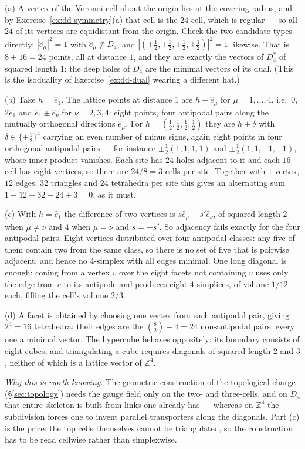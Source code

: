 {(a) A vertex of the Voronoi cell about the origin lies at the covering radius,
and by Exercise~\ref{ex:dd-symmetry}(a) that cell is the $24$-cell, which is
regular --- so all $24$ of its vertices are equidistant from the origin. Check
the two candidate types directly: $|\hat e_\mu|^2=1$ with $\hat e_\mu \notin
D_4$, and $|(\pm\tfrac12,\pm\tfrac12,\pm\tfrac12,\pm\tfrac12)|^2=1$ likewise.
That is $8+16=24$ points, all at distance $1$, and they are exactly the vectors
of $D_4^{*}$ of squared length $1$: the deep holes of $D_4$ are the minimal
vectors of its dual. (This is the isoduality of Exercise~\ref{ex:dd-dual}
wearing a different hat.)

(b) Take $h=\hat e_1$. The lattice points at distance $1$ are $h \pm \hat
e_\mu$ for $\mu=1,\dots,4$, i.e.\ $0$, $2\hat e_1$ and
$\hat e_1 \pm \hat e_\nu$ for $\nu=2,3,4$: eight points, four antipodal pairs
along the mutually orthogonal directions $\hat e_\mu$. For
$h=(\tfrac12,\tfrac12,\tfrac12,\tfrac12)$ they are $h+\delta$ with
$\delta\in\{\pm\tfrac12\}^4$ carrying an even number of minus signs, again
eight points in four orthogonal antipodal pairs --- for instance
$\pm\tfrac12(1,1,1,1)$ and $\pm\tfrac12(1,1,-1,-1)$, whose inner product
vanishes. Each site has $24$ holes adjacent to it and each $16$-cell has eight
vertices, so there are $24/8=3$ cells per site. Together with $1$ vertex, $12$
edges, $32$ triangles and $24$ tetrahedra per site this gives an alternating
sum $1-12+32-24+3=0$, as it must.

(c) With $h=\hat e_1$ the difference of two vertices is
$s\hat e_\mu - s'\hat e_\nu$, of squared length $2$ when $\mu\neq\nu$ and $4$
when $\mu=\nu$ and $s=-s'$. So adjacency fails exactly for the four antipodal
pairs. Eight vertices distributed over four antipodal classes: any five of them
contain two from the same class, so there is no set of five that is pairwise
adjacent, and hence no $4$-simplex with all edges minimal. One long diagonal is
enough: coning from a vertex $v$ over the eight facets not containing $v$ uses
only the edge from $v$ to its antipode and produces eight $4$-simplices, of
volume $1/12$ each, filling the cell's volume $2/3$.

(d) A facet is obtained by choosing one vertex from each antipodal pair, giving
$2^4=16$ tetrahedra; their edges are the $\binom{8}{2}-4=24$ non-antipodal
pairs, every one a minimal vector. The hypercube behaves oppositely: its
boundary consists of eight cubes, and triangulating a cube requires diagonals
of squared length $2$ and $3$, neither of which is a lattice vector of
$\mathbb{Z}^4$.

\emph{Why this is worth knowing.} The geometric construction of the topological
charge (\S\ref{sec:topology}) needs the gauge field only on the two- and
three-cells, and on $D_4$ that entire skeleton is built from links one already
has --- whereas on $\mathbb{Z}^4$ the subdivision forces one to invent parallel
transporters along the diagonals. Part (c) is the price: the top cells
themselves cannot be triangulated, so the construction has to be read
cellwise rather than simplexwise.}
